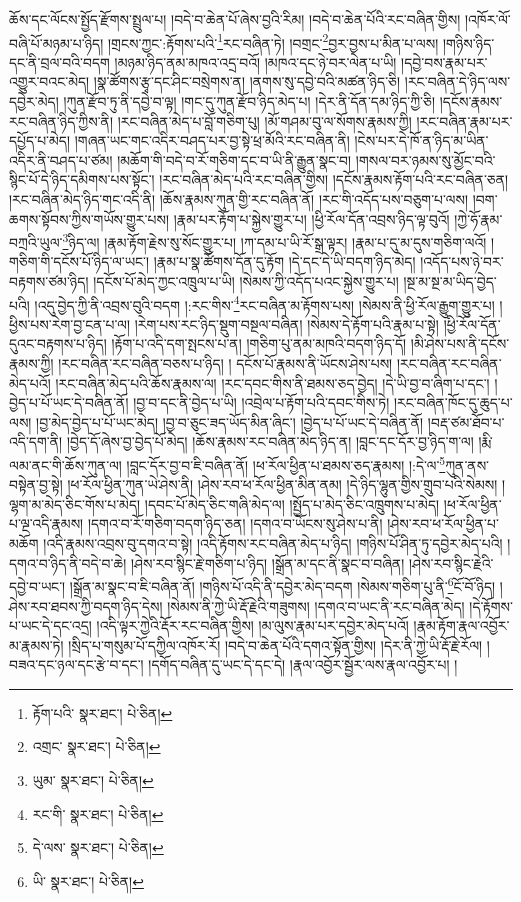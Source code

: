ཆོས་དང་ལོངས་སྤྱོད་རྫོགས་སྤྲུལ་པ། །བདེ་བ་ཆེན་པོ་ཞེས་བྱའི་རིམ། །བདེ་བ་ཆེན་པོའི་རང་བཞིན་གྱིས། །འཁོར་ལོ་བཞི་པོ་མཉམ་པ་ཉིད། །གྲངས་ཀྱང་:རྟོགས་པའི་\footnote{རྟོག་པའི་  སྣར་ཐང་།  པེ་ཅིན། }རང་བཞིན་ཏེ། །བགྲང་\footnote{འགྲང་  སྣར་ཐང་།  པེ་ཅིན། }བྱར་བྱས་པ་མིན་པ་ལས། །གཉིས་ཉིད་དང་ནི་བྲལ་བའི་བདག །མཉམ་ཉིད་ནམ་མཁའ་འདྲ་བའོ། །མཁའ་དང་ཉེ་བར་ལེན་པ་ཡི། །དབྱེ་བས་རྣམ་པར་འགྱུར་བའང་མེད། །སྣ་ཚོགས་རྩྭ་དང་ཤིང་བསྲེགས་ན། །ནགས་སུ་དབྱེ་བའི་མཚན་ཉིད་ཅི། །རང་བཞིན་དེ་ཉིད་ལས་དབྱེར་མེད། །ཀུན་རྫོབ་ཏུ་ནི་དབྱེ་བ་ལྟ། །གང་དུ་ཀུན་རྫོབ་ཉིད་མེད་པ། །དེར་ནི་དོན་དམ་ཉིད་ཀྱི་ཅི། །དངོས་རྣམས་རང་བཞིན་ཉིད་ཀྱིས་ནི། །རང་བཞིན་མེད་པ་བློ་གཅིག་པུ། །མོ་གཤམ་བུ་ལ་སོགས་རྣམས་ཀྱི། །རང་བཞིན་རྣམ་པར་དཔྱོད་པ་མེད། །གཞན་ཡང་གང་འདིར་བཤད་པར་བྱ་སྟེ་ཕྲ་མོའི་རང་བཞིན་ནི། །ངེས་པར་དེ་ཁོ་ན་ཉིད་མ་ཡིན་འདིར་ནི་བཤད་པ་ཙམ། །མཆོག་གི་བདེ་བ་རོ་གཅིག་དང་བ་ཡི་ནི་རྒྱུན་སྣང་བ། །གསལ་བར་ཉམས་སུ་མྱོང་བའི་སྙིང་པོ་དེ་ཉིད་དམིགས་པས་སྟོང་། །རང་བཞིན་མེད་པའི་རང་བཞིན་གྱིས། །དངོས་རྣམས་རྟོག་པའི་རང་བཞིན་ཅན། །རང་བཞིན་མེད་ཉིད་གང་འདི་ནི། །ཆོས་རྣམས་ཀུན་གྱི་རང་བཞིན་ནོ། །རང་གི་འདོད་པས་བཅུག་པ་ལས། །བག་ཆགས་སྟོབས་ཀྱིས་གཡོས་གྱུར་པས། །རྣམ་པར་རྟོག་པ་སྐྱེས་གྱུར་པ། །ཕྱི་རོལ་དོན་འབྲས་ཉིད་ལྟ་བུའོ། །ཀྱེ་ཧོ་རྣམ་བཀྲའི་ཡུལ་\footnote{ཡུམ་  སྣར་ཐང་།  པེ་ཅིན། }ཉིད་ལ། །རྣམ་རྟོག་རྗེས་སུ་སོང་གྱུར་པ། །ཀ་དམ་པ་ཡི་རོ་སྒྲ་ལྟར། །རྣམ་པ་དུ་མ་དུས་གཅིག་ལའོ། །གཅིག་གི་དངོས་པོ་ཉིད་ལ་ཡང་། །རྣམ་པ་སྣ་ཚོགས་དོན་དུ་རྟོག །དེ་དང་དེ་ཡི་བདག་ཉིད་མེད། །འདོད་པས་ཉེ་བར་བརྟགས་ཙམ་ཉིད། །དངོས་པོ་མེད་ཀྱང་འཁྲུལ་པ་ཡི། །སེམས་ཀྱི་འདོད་པའང་སྐྱེས་གྱུར་པ། །སྔ་མ་སྔ་མ་ཡིད་བྱེད་པའི། །འདུ་བྱེད་ཀྱི་ནི་འབྲས་བུའི་བདག །:རང་གིས་\footnote{རང་གི་  སྣར་ཐང་།  པེ་ཅིན། }རང་བཞིན་མ་རྟོགས་པས། །སེམས་ནི་ཕྱི་རོལ་རྒྱུག་གྱུར་པ། །ཕྱིས་པས་རེག་བྱ་ངན་པ་ལ། །རེག་པས་རང་ཉིད་སྡུག་བསྔལ་བཞིན། །སེམས་དེ་རྟོག་པའི་རྣམ་པ་སྟེ། །ཕྱི་རོལ་དོན་དུའང་བརྟགས་པ་ཉིད། །རྟོག་པ་འདི་དག་སྤངས་པ་ན། །གཅིག་པུ་ནམ་མཁའི་བདག་ཉིད་དོ། །མི་ཤེས་པས་ནི་དངོས་རྣམས་ཀྱི། །རང་བཞིན་རང་བཞིན་བཅས་པ་ཉིད། །
དངོས་པོ་རྣམས་ནི་ཡོངས་ཤེས་པས། །རང་བཞིན་རང་བཞིན་མེད་པའོ། །རང་བཞིན་མེད་པའི་ཆོས་རྣམས་ལ། །རང་དབང་གིས་ནི་ཐམས་ཅད་བྱེད། །དེ་ཡི་བྱ་བ་ཞིག་པ་དང་། །བྱེད་པ་པོ་ཡང་དེ་བཞིན་ནོ། །བྱ་བ་དང་ནི་བྱེད་པ་ཡི། །འབྲེལ་པ་རྟོག་པའི་དབང་གིས་ཏེ། །རང་བཞིན་ཁོང་དུ་ཆུད་པ་ལས། །བྱ་མེད་བྱེད་པ་པོ་ཡང་མེད། །བྱ་བ་ཅུང་ཟད་ཡོད་མིན་ཞིང་། །བྱེད་པ་པོ་ཡང་དེ་བཞིན་ནོ། །བརྡ་ཙམ་ཐོབ་པ་འདི་དག་ནི། །བྱེད་དོ་ཞེས་བྱ་བྱེད་པོ་མེད། །ཆོས་རྣམས་རང་བཞིན་མེད་ཉིད་ན། །བླང་དང་དོར་བྱ་ཉིད་ག་ལ། །རྨི་ལམ་ནང་གི་ཆོས་ཀུན་ལ། །བླང་དོར་བྱ་བ་ཇི་བཞིན་ནོ། །ཕ་རོལ་ཕྱིན་པ་ཐམས་ཅད་རྣམས། །:དེ་ལ་\footnote{དེ་ལས་  སྣར་ཐང་།  པེ་ཅིན། }ཀུན་ནས་བསྟེན་བྱ་སྟེ། །ཕ་རོལ་ཕྱིན་ཀུན་ཡེ་ཤེས་ནི། །ཤེས་རབ་ཕ་རོལ་ཕྱིན་མིན་ནམ། །དེ་ཉིད་ལྷུན་གྱིས་གྲུབ་པའི་སེམས། །ལྷག་མ་མེད་ཅིང་གོས་པ་མེད། །དབང་པོ་མེད་ཅིང་གཞི་མེད་ལ། །སྤྱོད་པ་མེད་ཅིང་འཁྲུགས་པ་མེད། །ཕ་རོལ་ཕྱིན་པ་ལྔ་འདི་རྣམས། །དགའ་བ་རོ་གཅིག་བདག་ཉིད་ཅན། །དགའ་བ་ཡོངས་སུ་ཤེས་པ་ནི། །ཤེས་རབ་ཕ་རོལ་ཕྱིན་པ་མཆོག །འདི་རྣམས་འབྲས་བུ་དགའ་བ་སྟེ། །འདི་རྟོགས་རང་བཞིན་མེད་པ་ཉིད། །གཉིས་པོ་ཤིན་ཏུ་དབྱེར་མེད་པའི། །དགའ་བ་ཉིད་ནི་བདེ་བ་ཆེ། །ཤེས་རབ་སྙིང་རྗེ་གཅིག་པ་ཉིད། །སྒྲོན་མ་དང་ནི་སྣང་བ་བཞིན། །ཤེས་རབ་སྙིང་རྗེའི་དབྱེ་བ་ཡང་། །སྒྲོན་མ་སྣང་བ་ཇི་བཞིན་ནོ། །གཉིས་པོ་འདི་ནི་དབྱེར་མེད་བདག །སེམས་གཅིག་པུ་ནི་\footnote{ཡི་  སྣར་ཐང་།  པེ་ཅིན། }ངོ་བོ་ཉིད། །ཤེས་རབ་ཐབས་ཀྱི་བདག་ཉིད་དེས། །སེམས་ནི་ཀྱེ་ཡི་རྡོ་རྗེའི་གཟུགས། །དགའ་བ་ཡང་ནི་རང་བཞིན་མེད། །དེ་རྟོགས་པ་ཡང་དེ་དང་འདྲ། །འདི་ལྟར་ཀྱེའི་རྡོར་རང་བཞིན་གྱིས། །མ་ལུས་རྣམ་པར་དབྱེར་མེད་པའོ། །རྣམ་རྟོག་རྣལ་འབྱོར་མ་རྣམས་ཏེ། །སྲིད་པ་གསུམ་པོ་དཀྱིལ་འཁོར་རོ། །བདེ་བ་ཆེན་པོའི་དགའ་སྟོན་གྱིས། །དེར་ནི་ཀྱེ་ཡི་རྡོ་རྗེ་རོལ། །བཟའ་དང་ཉལ་དང་རྩེ་བ་དང་། །དགོད་བཞིན་དུ་ཡང་དེ་དང་དེ། །རྣལ་འབྱོར་སྦྱོར་ལས་རྣལ་འབྱོར་པ། །
